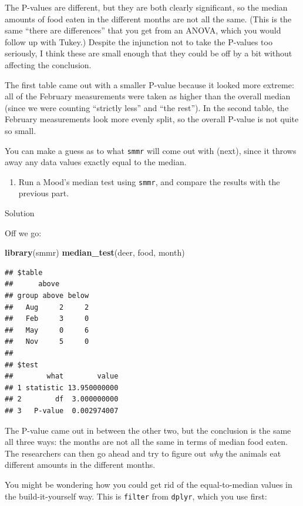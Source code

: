 \documentclass[]{tufte-book}
\newenvironment{Shaded}{}{}
\newcommand{\KeywordTok}[1]{\textcolor[rgb]{0.00,0.44,0.13}{\textbf{#1}}}
\newcommand{\NormalTok}[1]{#1}
\providecommand{\tightlist}{%
  \setlength{\itemsep}{0pt}\setlength{\parskip}{0pt}}
\theoremstyle{definition}
\theoremstyle{definition}
\theoremstyle{definition}
\theoremstyle{remark}
\begin{document}
The P-values are different, but they are both clearly significant, so
the median amounts of food eaten in the different months are not all the
same. (This is the same ``there are differences'' that you get from an
ANOVA, which you would follow up with Tukey.) Despite the injunction not
to take the P-values too seriously, I think these are small enough that
they could be off by a bit without affecting the conclusion.

The first table came out with a smaller P-value because it looked more
extreme: all of the February measurements were taken as higher than the
overall median (since we were counting ``strictly less'' and ``the
rest''). In the second table, the February measurements look more evenly
split, so the overall P-value is not quite so small.

You can make a guess as to what \texttt{smmr} will come out with (next),
since it throws away any data values exactly equal to the median.

\begin{enumerate}
\def\labelenumi{(\alph{enumi})}
\setcounter{enumi}{3}
\tightlist
\item
  Run a Mood's median test using \texttt{smmr}, and compare the results
  with the previous part.
\end{enumerate}

Solution

Off we go:

\begin{Shaded}
\begin{Highlighting}[]
\KeywordTok{library}\NormalTok{(smmr)}
\KeywordTok{median_test}\NormalTok{(deer, food, month)}
\end{Highlighting}
\end{Shaded}

\begin{verbatim}
## $table
##      above
## group above below
##   Aug     2     2
##   Feb     3     0
##   May     0     6
##   Nov     5     0
## 
## $test
##        what        value
## 1 statistic 13.950000000
## 2        df  3.000000000
## 3   P-value  0.002974007
\end{verbatim}

The P-value came out in between the other two, but the conclusion is the
same all three ways: the months are not all the same in terms of median
food eaten. The researchers can then go ahead and try to figure out
\emph{why} the animals eat different amounts in the different months.

You might be wondering how you could get rid of the equal-to-median
values in the build-it-yourself way. This is \texttt{filter} from
\texttt{dplyr}, which you use first:
\end{document}
